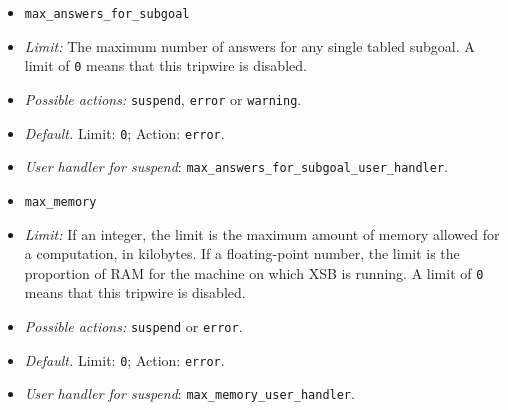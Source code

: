 \begin{itemize}
\item {\tt max\_answers\_for\_subgoal}
\bi  
\item {\em Limit:} The maximum number of answers for any single tabled
 subgoal.  A limit of {\tt 0} means that
 this tripwire is disabled.
\item{\em  Possible actions:} {\tt suspend}, {\tt error} or {\tt warning}.
\item {\em Default.} Limit: {\tt 0}; Action: {\tt error}.
\item {\em User handler for suspend}: {\tt max\_answers\_for\_subgoal\_user\_handler}.
\ei

\item {\tt max\_memory}
\bi  
\item {\em Limit:} If an integer, the limit is the maximum
 amount of memory allowed for a computation, in kilobytes.  If a
 floating-point number, the limit is the proportion of RAM for the
 machine on which XSB is running.  A limit of {\tt 0} means that
 this tripwire is disabled.
\item{\em Possible actions:} {\tt suspend} or {\tt error}. 
\item {\em Default.} Limit: {\tt 0}; Action: {\tt error}.
\item {\em User handler for suspend}: {\tt max\_memory\_user\_handler}.
\ei

\end{itemize}

